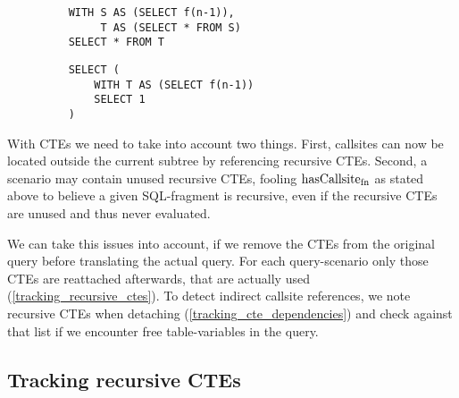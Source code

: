 \begin{wrapfigure}{r}{.5\textwidth}\vspace{-5mm} 
    \begin{minipage}{\linewidth}
    \label{fig:simple_indiref}\par\vfill
    \begin{verbatim}
    WITH S AS (SELECT f(n-1)),
         T AS (SELECT * FROM S)
    SELECT * FROM T
    \end{verbatim}
    \label{fib_nonrec_scenarios}\par\vfill
    \begin{verbatim}
    SELECT (
        WITH T AS (SELECT f(n-1))
        SELECT 1
    )
    \end{verbatim}
    \label{fig:trimmed_ref}
\end{minipage}
\caption{}
\label{lst:indirect_callsite_ref}\vspace{-5mm} 
\end{wrapfigure}

With CTEs we need to take into account two things. First, callsites can now be located outside the current subtree by referencing recursive CTEs. Second, a scenario may contain unused recursive CTEs, fooling $\operatorname{\text{hasCallsite}_{fn}}$ as stated above to believe a given SQL-fragment is recursive, even if the recursive CTEs are unused and thus never evaluated.

We can take this issues into account, if we remove the CTEs from the original query before translating the actual query. For each query-scenario only those CTEs are reattached afterwards, that are actually used (\autoref{tracking_recursive_ctes}). To detect indirect callsite references, we note recursive CTEs when detaching (\autoref{tracking_cte_dependencies}) and check against that list if we encounter free table-variables in the query.

\subsection{Tracking recursive CTEs}\label{tracking_recursive_ctes}

